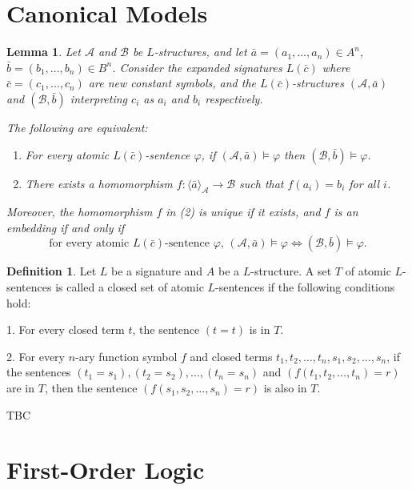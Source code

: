 \documentclass[12pt, reqno]{amsart}
\newtheorem{lemma}[theorem]{Lemma}
\theoremstyle{definition}
\newtheorem{definition}[theorem]{Definition}
\theoremstyle{remark}
\numberwithin{equation}{section}
\begin{document}
{\section{Canonical Models}

\begin{lemma}
    Let $\mathcal{A}$ and $\mathcal{B}$ be $L$-structures, and let $\bar{a} = (a_1, \ldots, a_n) \in A^n$, $\bar{b} = (b_1, \ldots, b_n) \in B^n$. Consider the expanded signatures $L(\bar{c})$ where $\bar{c} = (c_1, \ldots, c_n)$ are new constant symbols, and the $L(\bar{c})$-structures $(\mathcal{A}, \bar{a})$ and $(\mathcal{B}, \bar{b})$ interpreting $c_i$ as $a_i$ and $b_i$ respectively.

    The following are equivalent:
    \begin{enumerate}
        \item For every atomic $L(\bar{c})$-sentence $\varphi$, if $(\mathcal{A}, \bar{a}) \models \varphi$ then $(\mathcal{B}, \bar{b}) \models \varphi$.
        \item There exists a homomorphism $f: \langle \bar{a} \rangle_{\mathcal{A}} \to \mathcal{B}$ such that $f(a_i) = b_i$ for all $i$.
    \end{enumerate}
    Moreover, the homomorphism $f$ in (2) is unique if it exists, and $f$ is an embedding if and only if
    \[
        \text{for every atomic $L(\bar{c})$-sentence $\varphi$, } (\mathcal{A}, \bar{a}) \models \varphi \iff (\mathcal{B}, \bar{b}) \models \varphi.
    \]
\end{lemma}

\begin{definition}
    Let $L$ be a signature and $A$ be a $L$-structure. A set $T$ of atomic $L$-sentences is called a closed set of atomic $L$-sentences if the following conditions hold:

    1. For every closed term $t$, the sentence $(t = t)$ is in $T$.

    2. For every $n$-ary function symbol $f$ and closed terms $t_1, t_2, \ldots, t_n, s_1, s_2, \ldots, s_n$, if the sentences $(t_1 = s_1), (t_2 = s_2), \ldots, (t_n = s_n)$ and $(f(t_1, t_2, \ldots, t_n) = r)$ are in $T$, then the sentence $(f(s_1, s_2, \ldots, s_n) = r)$ is also in $T$.
\end{definition}

TBC

\section{First-Order Logic}

}
\end{document}
